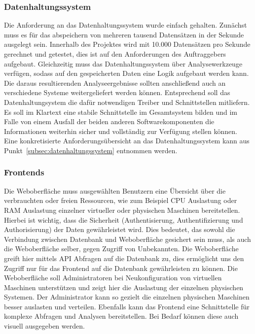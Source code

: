 \subsubsection{Datenhaltungssystem}
Die Anforderung an das Datenhaltungssystem wurde einfach gehalten. Zunächst
muss es für das abspeichern von mehreren tausend Datensätzen in der Sekunde
ausgelegt sein. Innerhalb des Projektes wird mit 10.000 Datensätzen pro
Sekunde gerechnet und getestet, dies ist auf den Anforderungen des
Auftraggebers aufgebaut. Gleichzeitig muss das Datenhaltungssystem über
Analysewerkzeuge verfügen, sodass auf den gespeicherten Daten eine Logik
aufgebaut werden kann. Die daraus resultierenden Analyseergebnisse sollten
anschließend auch an verschiedene Systeme weitergeliefert werden können.
Entsprechend soll das Datenhaltungsystem die dafür notwendigen Treiber und
Schnittstellen mitliefern. Es soll im Klartext eine stabile Schnittstelle
im Gesamtsystem bilden und im Falle von einem Ausfall der beiden anderen
Softwarekomponenten die Informationen weiterhin sicher und vollständig zur
Verfügung stellen können. Eine konkretisierte Anforderungsübersicht an das
Datenhaltungssystem kann aus Punkt~\ref{subsec:datenhaltungssystem} entnommen
werden.
\nl%

\subsubsection{Frontends}
Die Weboberfläche muss ausgewählten Benutzern eine Übersicht über die
verbrauchten oder freien Ressourcen, wie zum Beispiel CPU Auslastung oder RAM
Auslastung einzelner virtueller oder physischen Maschinen bereitstellen.
Hierbei ist wichtig, dass die Sicherheit (Authentisierung, Authentifizierung
und Authorisierung) der Daten gewährleistet wird. Dies bedeutet, das sowohl die
Verbindung zwischen Datenbank und Weboberfläche gesichert sein muss, als auch
die Weboberfläche selber, gegen Zugriff von Unbekannten. Die Weboberfläche
greift hier mittels API Abfragen auf die Datenbank zu, dies ermöglicht uns den
Zugriff nur für das Frontend auf die Datenbank gewährleisten zu können.  Die
Weboberfläche soll Administratoren bei Neukonfiguration von virtuellen
Maschinen unterstützen und zeigt hier die Auslastung der einzelnen physischen
Systemen. Der Administrator kann so gezielt die einzelnen physischen Maschinen
besser auslasten und verteilen. Ebenfalls kann das Frontend eine Schnittstelle
für komplexe Abfragen und Analysen bereitstellen. Bei Bedarf können diese auch
visuell ausgegeben werden.
\mr%

